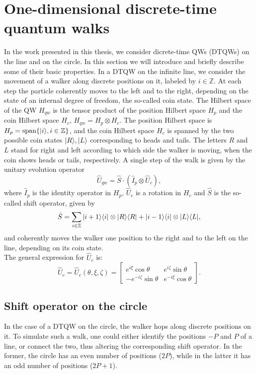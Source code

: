 \section{One-dimensional discrete-time quantum walks}
\label{sec:preliminaries}
In the work presented in this thesis, we consider dicrete-time QWs (DTQWs) on the line and on the circle. In this section we will introduce and briefly describe some of their basic properties.
In a DTQW on the infinite line, we consider the movement of a walker along discrete positions on  it, labeled by $i \in \mathbb{Z}$. At each step the particle coherently moves to the left and to the right, depending on the state of an internal degree of freedom, the so-called coin state. 
The Hilbert space of the QW $H_{qw}$ is the tensor product of the position Hilbert space $H_p$ and the coin Hilbert space $H_c$, $H_{qw}=H_p\otimes H_c$. The position Hilbert space is $H_p=\text{span}\{| i \rangle, i\in \mathbb{Z}\}$, and the coin Hilbert space $H_c$ is spanned by the two possible coin states $| R \rangle,| L \rangle$ corresponding to heads and tails. The letters $R$ and $L$ stand for right and left according to which side the walker is moving, when the coin shows heads or tails, respectively. 
A single step of the walk is given by the unitary evolution operator
$$\hat{U}_{qw}= \hat{S}\cdot (\hat{I}_p\otimes \hat{U}_c),$$
where $\hat{I}_p$ is the identity operator in $H_p$, $\hat{U}_c$ is a rotation in $H_c$ and $\hat{S}$ is the so-called shift operator, given by
$$\hat{S}=\sum_{i\in\mathbb{Z}} | i+1 \rangle\langle i |\otimes | R \rangle\langle R |+ | i-1 \rangle\langle i |\otimes | L \rangle\langle L |,$$
and coherently moves the walker one position to the right and to the left on the line, depending on its coin state.\\
The general expression for $\hat{U}_c$ is:
\begin{equation}
\label{coin}
\hat{U}_c = \hat{U}_c(\theta, \xi, \zeta) = \left[
				\begin{array}{cc}
					e^{i\xi}
					\cos\theta & e^{i\zeta}
					\sin\theta\\
					-e^{-i\zeta}
					\sin\theta & e^{-i\xi}
					\cos\theta
				\end{array}
			\right].
\end{equation}
 
\subsection{Shift operator on the circle}
In the case of a DTQW on the circle, the walker hops along discrete positions on it.
To simulate such a walk, one could either identify the positions $-P$ and $P$ of a line, or connect the two, thus altering the corresponding shift operator. In the former, the circle has an even number of positions ($2P$), while in the latter it has an odd number of positions ($2P+1$).

